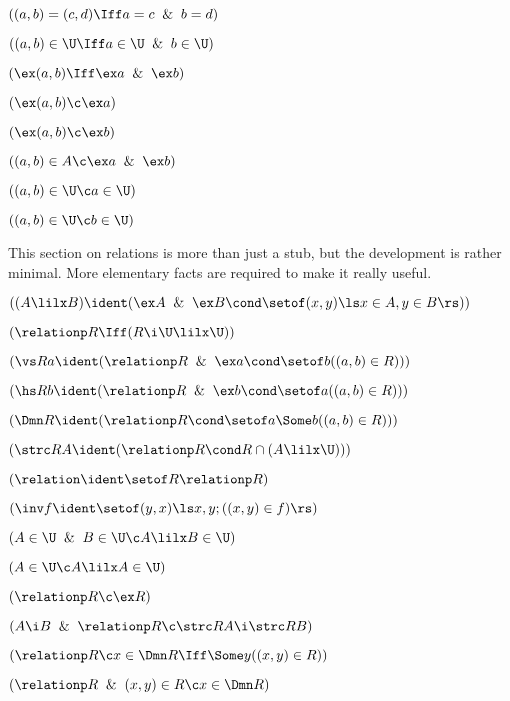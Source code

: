 

 $((a,b) = (c,d) \Iff a = c \And b = d)$

 $((a,b) \in \U \Iff a \in \U \And b\in\U)$

 $(\ex(a,b)\Iff \ex a\And \ex b)$

 $(\ex(a,b)\c \ex a)$

 $(\ex(a,b)\c  \ex b)$

 $((a,b)\in A \c \ex a \And \ex b)$

 $((a,b) \in \U \c a \in \U)$

 $((a,b) \in \U \c b \in \U)$
	\lineb  


This section on relations is more than just a stub, but the development is
rather minimal.  More elementary facts are required to make it really useful.  
\lineb


 $((A \lilx B) \ident (\ex A \And \ex B \cond \setof (x,y)\ls x \in A, y \in B\rs))$

 $(\relationp R \Iff (R \i \U \lilx \U))$

 $(\vs Ra \ident(\relationp R \And \ex a\cond\setof b((a,b)\in R)))$ 

 $(\hs Rb \ident (\relationp R \And \ex b\cond\setof a((a,b)\in R)))$ 

 $(\Dmn R \ident (\relationp R \cond \setof a \Some b((a,b)\in R)))$

 $(\strc RA \ident (\relationp R \cond R \cap (A \lilx \U)))$ 

 $(\relation \ident \setof R \relationp R)$

 $(\inv f \ident \setof (y,x) \ls x,y ;((x,y)\in f)\rs)$
\lineb


 $(A \in \U \And B \in \U \c A \lilx B \in \U)$

 $(A \in \U \c A \lilx A \in \U)$

 $(\relationp R \c \ex R)$

 $(A \i B \And \relationp R \c \strc RA \i \strc RB)$

 $(\relationp R \c x \in \Dmn R \Iff \Some y((x,y) \in R))$

 $(\relationp R \And (x,y) \in R \c x \in \Dmn R)$

